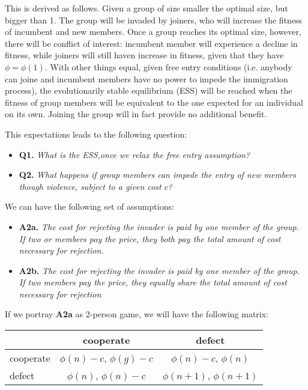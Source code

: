\documentclass{article}
\begin{document}
This is derived as follows. Given a group of size smaller the optimal size, but bigger than 1. The group will be invaded by joiners, who will increase the fitness of incumbent and new members. Once a group reaches its optimal size, however, there will be conflict of interest: incumbent member will experience a decline in fitness, while joiners will still haven increase in fitness, given that they have $\phi=\phi(1)$. With other things equal, given free entry conditions (i.e. anybody can joine and incumbent members have no power to impede the immigration process), the evolutionarily stable equilibrium (ESS) will be reached when the fitness of group members will be equivalent to the one expected for an individual on its own. Joining the group will in fact provide no additional benefit.

This expectations leads to the following question:

\begin{itemize}
\item {\bf Q1.} \emph{What is the ESS,once we relax the free entry assumption?}
\item {\bf Q2.} \emph{What happens if group members can impede the entry of new members though violence, subject to a given cost $c$?}
\end{itemize}

We can have the following set of assumptions:

\begin{itemize}
\item {\bf A2a.} \emph{The cost for rejecting the invader is paid by one member of the group. If two or members pay the price, they both pay the total amount of cost necessary for rejection.}
\item {\bf A2b.} \emph{The cost for rejecting the invader is paid by one member of the group. If two members pay the price, they equally share the total amount of cost necessary for rejection}
\end{itemize}

If we portray {\bf A2a} as 2-person game, we will have the following matrix:


\begin{center}
\begin{tabular} {|l|c|c|}
\hline
 &cooperate&defect \\ \hline
cooperate&$\phi(n)-c$, $\phi(g)-c$&$\phi(n)-c$, $\phi(n)$ \\ \hline
defect&$\phi(n)$, $\phi(n)-c$&$\phi(n+1)$, $\phi(n+1)$ \\ \hline
\end{tabular}
\end{center}
\end{document}
